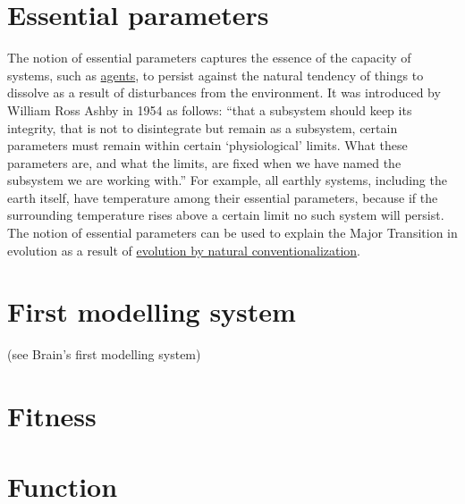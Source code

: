 \documentclass[12pt]{article}
\begin{document}
\hypertarget{essential_parameters}{}
\section{Essential parameters}
The notion of essential parameters captures the essence of the
capacity of systems, such as \hyperlink{agent}{agents}, to persist
against the natural tendency of things to dissolve as a result of
disturbances from the environment. It was introduced by William Ross
Ashby in 1954 as follows: ``that a subsystem should keep its
integrity, that is not to disintegrate but remain as a subsystem,
certain parameters must remain within certain `physiological'
limits. What these parameters are, and what the limits, are fixed when
we have named the subsystem we are working with.'' For example, all
earthly systems, including the earth itself, have temperature among
their essential parameters, because if the surrounding temperature
rises above a certain limit no such system will persist. The notion of
essential parameters can be used to explain the Major Transition in
evolution as a result of
\hyperlink{natural_conventionalization}{evolution by natural
  conventionalization}.


\section{First modelling system} (see Brain's first modelling system)

\hypertarget{fitness}{}
\section{Fitness}

\hypertarget{function}{}
\section{Function}
\end{document}
